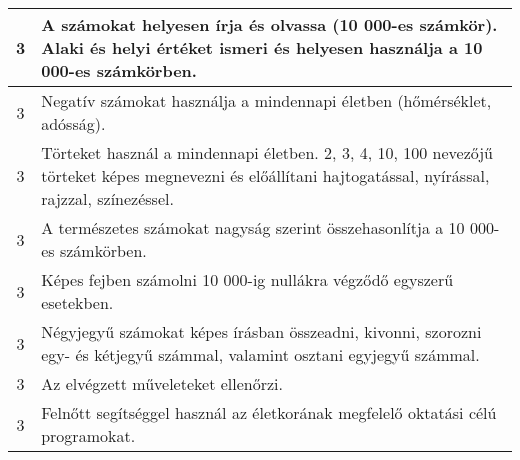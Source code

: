 \begin{longtable}{c | p{} }
                                
                                          3 &  A számokat helyesen írja és olvassa (10 000-es számkör). Alaki és helyi értéket ismeri és helyesen használja a 10 000-es számkörben. \\ \hline
                                          3 &  Negatív számokat használja a mindennapi életben (hőmérséklet, adósság). \\ \hline
                                          3 &  Törteket használ a mindennapi életben. 2, 3, 4, 10, 100 nevezőjű törteket képes megnevezni és előállítani hajtogatással, nyírással, rajzzal, színezéssel. \\ \hline
                                          3 &  A természetes számokat nagyság szerint összehasonlítja a 10 000-es számkörben. \\ \hline
                                          3 &  Képes fejben számolni 10 000-ig nullákra végződő egyszerű esetekben. \\ \hline
                                          3 &  Négyjegyű számokat képes írásban összeadni, kivonni, szorozni egy- és kétjegyű számmal, valamint osztani egyjegyű számmal. \\ \hline
                                          3 &  Az elvégzett műveleteket ellenőrzi. \\ \hline
                                          3 &  Felnőtt segítséggel használ az életkorának megfelelő oktatási célú programokat. \\ \hline
                                      

\end{longtable}
